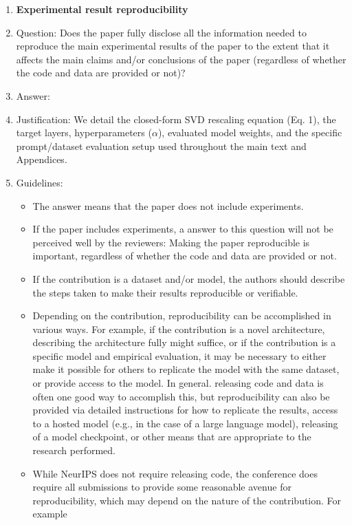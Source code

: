 \documentclass{article}
\begin{document}
\begin{enumerate}
    \item {\bf Experimental result reproducibility}
    \item[] Question: Does the paper fully disclose all the information needed to reproduce the main experimental results of the paper to the extent that it affects the main claims and/or conclusions of the paper (regardless of whether the code and data are provided or not)?
    \item[] Answer: \answerYes{}
    \item[] Justification: We detail the closed-form SVD rescaling equation (Eq. 1), the target layers, hyperparameters ($\alpha$), evaluated model weights, and the specific prompt/dataset evaluation setup used throughout the main text and Appendices.
    \item[] Guidelines:
    \begin{itemize}
        \item The answer \answerNA{} means that the paper does not include experiments.
        \item If the paper includes experiments, a \answerNo{} answer to this question will not be perceived well by the reviewers: Making the paper reproducible is important, regardless of whether the code and data are provided or not.
        \item If the contribution is a dataset and\slash or model, the authors should describe the steps taken to make their results reproducible or verifiable. 
        \item Depending on the contribution, reproducibility can be accomplished in various ways. For example, if the contribution is a novel architecture, describing the architecture fully might suffice, or if the contribution is a specific model and empirical evaluation, it may be necessary to either make it possible for others to replicate the model with the same dataset, or provide access to the model. In general. releasing code and data is often one good way to accomplish this, but reproducibility can also be provided via detailed instructions for how to replicate the results, access to a hosted model (e.g., in the case of a large language model), releasing of a model checkpoint, or other means that are appropriate to the research performed.
        \item While NeurIPS does not require releasing code, the conference does require all submissions to provide some reasonable avenue for reproducibility, which may depend on the nature of the contribution. For example
        \begin{enumerate}

\end{enumerate}
\end{itemize}
\end{enumerate}
\end{document}
